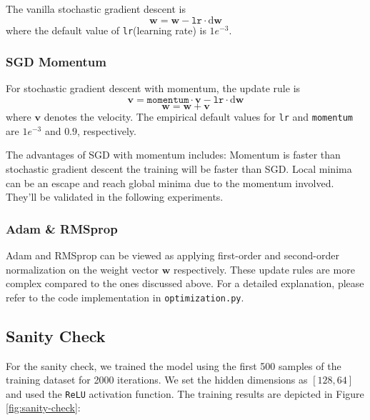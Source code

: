 \documentclass[10pt,a4paper,twoside]{tau}
\renewcommand{\vec}[1]{\mathbf{#1}}
\renewcommand{\d}{\text{d}}
\begin{document}
The vanilla stochastic gradient descent is
\begin{equation}
    \vec{w} = \vec{w} - \texttt{lr} \cdot\d \vec{w} \tag{4.1.1}
\end{equation}
where the default value of \texttt{lr}(learning rate) is $1e^{-3}$.

\subsubsection{SGD Momentum}

For stochastic gradient descent with momentum, the update rule is 
\begin{equation}
    \vec{v} = \texttt{momentum} \cdot\vec{v} - \texttt{lr} \cdot\d\vec{w} \tag{4.1.2}
\end{equation}
\begin{equation}
    \vec{w} = \vec{w} + \vec{v} \tag{4.1.3}
\end{equation}
where $\vec{v}$ denotes the velocity. The empirical default values for \texttt{lr} and \texttt{momentum} are $1e^{-3}$ and $0.9$, respectively.

The advantages of SGD with momentum includes:
Momentum is faster than stochastic gradient descent the training will be faster than SGD. Local minima can be an escape and reach global minima due to the momentum involved. They'll be validated in the following experiments.

\subsubsection{Adam \& RMSprop}
Adam and RMSprop can be viewed as applying first-order and second-order normalization on the weight vector $\vec{w}$ respectively. These update rules are more complex compared to the ones discussed above. For a detailed explanation, please refer to the code implementation in \texttt{optimization.py}.


\subsection{Sanity Check}

For the sanity check, we trained the model using the first 500 samples of the training dataset for 2000 iterations. We set the hidden dimensions as $[128, 64]$ and used the \texttt{ReLU} activation function. The training results are depicted in Figure \ref{fig:sanity-check}:
\end{document}
